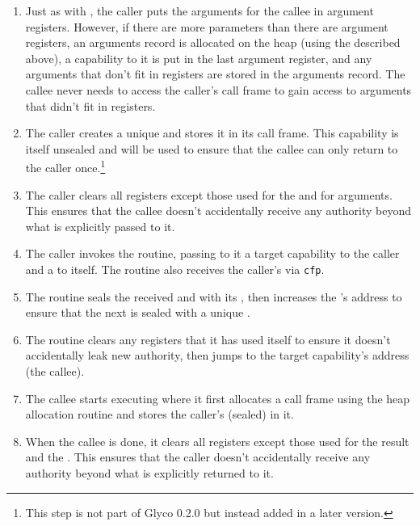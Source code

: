 \documentclass[main.tex]{subfiles}
\begin{document}
\begin{enumerate}
	
	\item Just as with , the caller puts the arguments for the callee in argument registers. However, if there are more parameters than there are argument registers, an arguments record is allocated on the heap (using the  described above), a capability to it is put in the last argument register, and any arguments that don't fit in registers are stored in the arguments record. The callee never needs to access the caller's call frame to gain access to arguments that didn't fit in registers.
	
	\item \label{itm:retseal} The caller creates a unique  and stores it in its call frame. This capability is itself unsealed and will be used to ensure that the callee can only return to the caller once.\footnote{This step is not part of Glyco 0.2.0 but instead added in a later version.}
	
	\item The caller clears all registers except those used for the  and for arguments. This ensures that the callee doesn't accidentally receive any authority beyond what is explicitly passed to it.
	
	\item The caller invokes the  routine, passing to it a target capability to the caller and a  to itself. The routine also receives the caller's  via \texttt{cfp}.
	
	\item The routine seals the received  and  with its , then increases the 's address to ensure that the next  is sealed with a unique .
	
	\item The routine clears any registers that it has used itself to ensure it doesn't accidentally leak new authority, then jumps to the target capability's address (the callee).
	
	\item The callee starts executing where it first allocates a call frame using the heap allocation routine and stores the caller's (sealed)  in it.
	
	\item When the callee is done, it clears all registers except those used for the result and the . This ensures that the caller doesn't accidentally receive any authority beyond what is explicitly returned to it.
	

\end{enumerate}
\end{document}
